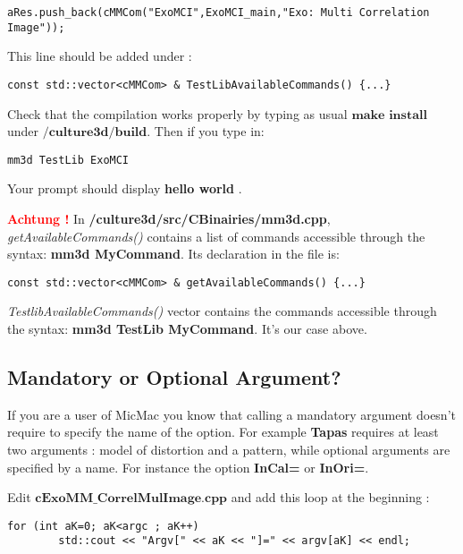 \documentclass[a4paper]{book}
\begin{document}
\begin{lstlisting}
aRes.push_back(cMMCom("ExoMCI",ExoMCI_main,"Exo: Multi Correlation Image"));
\end{lstlisting}

This line should be added under : \newline
\begin{lstlisting}
const std::vector<cMMCom> & TestLibAvailableCommands() {...}
\end{lstlisting}

Check that the compilation works properly by typing as usual $\textbf{make install}$ under \og$\textbf{/culture3d/build}$\fg. Then if you type in:

\begin{lstlisting}
mm3d TestLib ExoMCI
\end{lstlisting}
Your prompt should display \og \textbf{hello world} \fg.\newline

 \textbf{\textcolor{red}{Achtung !}} In \textbf{/culture3d/src/CBinairies/mm3d.cpp},  \textit{getAvailableCommands()} contains a list of commands accessible through the syntax: \textbf{mm3d MyCommand}. Its declaration in the file is:
\begin{lstlisting}
const std::vector<cMMCom> & getAvailableCommands() {...}
\end{lstlisting}

\textit{TestlibAvailableCommands()} vector contains the commands accessible through the syntax: \textbf{mm3d TestLib MyCommand}. It's our case above.

\subsection{Mandatory or Optional Argument?}
If you are a user of MicMac you know that calling a mandatory argument doesn't require to specify the name of the option. For example \textbf{Tapas} requires at least two arguments : model of distortion and a pattern, while optional arguments are specified by a name. For instance the option \textbf{InCal=} or \textbf{InOri=}.\newline


Edit $\textbf{cExoMM\_CorrelMulImage.cpp}$ and add this loop at the beginning :\newline

\begin{lstlisting}
for (int aK=0; aK<argc ; aK++)
        std::cout << "Argv[" << aK << "]=" << argv[aK] << endl;
\end{lstlisting}
\end{document}
